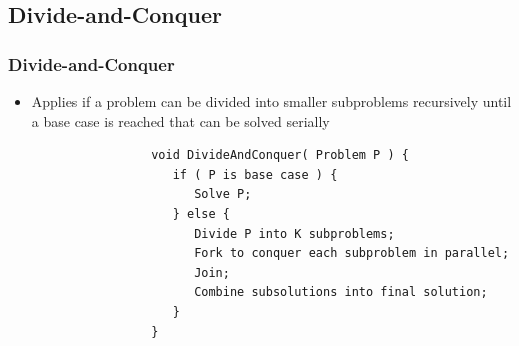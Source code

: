 \documentclass[xcolor=dvipsnames]{beamer}
\begin{document}
	\subsection{Divide-and-Conquer}
		\begin{frame}[fragile] \frametitle{Divide-and-Conquer}
			\begin{itemize}
				\item Applies if a problem can be divided into smaller 
                subproblems recursively until a base case is reached that can
                be solved serially
			\end{itemize}
				\begin{verbatim}
					void DivideAndConquer( Problem P ) {
					   if ( P is base case ) {
					      Solve P;
					   } else {
					      Divide P into K subproblems;
					      Fork to conquer each subproblem in parallel;
					      Join;
					      Combine subsolutions into final solution;
					   }
					}
				\end{verbatim}
		\end{frame}
\end{document}
